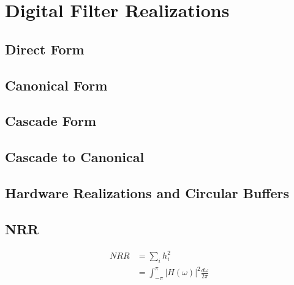 \section{Digital Filter Realizations}
\subsection{Direct Form}
\subsection{Canonical Form}
\subsection{Cascade Form}
\subsection{Cascade to Canonical}
\subsection{Hardware Realizations and Circular Buffers}

\subsection{NRR}
\begin{align}
NRR &= \sum_i h_i^2 \\
    &= \int_{-\pi}^{\pi}|H(\omega)|^2 \frac{d\omega}{2\pi}
\end{align}
